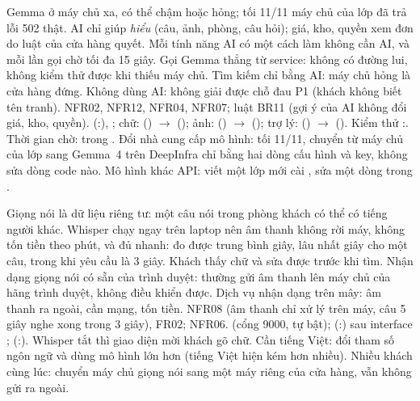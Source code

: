 {Gemma ở máy chủ xa, có thể chậm hoặc hỏng; tối 11/11 máy chủ của lớp đã trả lỗi 502 thật. AI chỉ giúp \emph{hiểu} (câu, ảnh, phòng, câu hỏi); giá, kho, quyền xem đơn do luật của cửa hàng quyết. Mỗi tính năng AI có một cách làm không cần AI, và mỗi lần gọi chờ tối đa 15 giây.}
{Gọi Gemma thẳng từ service: không có đường lui, không kiểm thử được khi thiếu máy chủ. Tìm kiếm chỉ bằng AI: máy chủ hỏng là cửa hàng đứng. Không dùng AI: không giải được chỗ đau P1 (khách không biết tên tranh).}
{NFR02, NFR12, NFR04, NFR07; luật BR11 (gợi ý của AI không đổi giá, kho, quyền).}
{ (:\dongLlmChat), ; chữ:  (\dongUnderstand) $\to$  (\dongParseRules); ảnh:  (\dongDescribe) $\to$  (\dongLocalColor); trợ lý:  (\dongAsk) $\to$  (\dongNoAi). Kiểm thử :\dongTestFallback. Thời gian chờ:  trong .}
{Đổi nhà cung cấp mô hình:  tối 11/11, chuyển từ máy chủ của lớp sang Gemma~4 trên DeepInfra chỉ bằng hai dòng cấu hình và key, không sửa dòng code nào. Mô hình khác API: viết một lớp mới cài , sửa một dòng trong .}

{Giọng nói là dữ liệu riêng tư: một câu nói trong phòng khách có thể có tiếng người khác. Whisper chạy ngay trên laptop nên âm thanh không rời máy, không tốn tiền theo phút, và đủ nhanh: đo được trung bình \evSttMean{} giây, lâu nhất \evSttMax{} giây cho một câu, trong khi yêu cầu là 3 giây. Khách thấy chữ và sửa được trước khi tìm.}
{Nhận dạng giọng nói có sẵn của trình duyệt: thường gửi âm thanh lên máy chủ của hãng trình duyệt, không điều khiển được. Dịch vụ nhận dạng trên mây: âm thanh ra ngoài, cần mạng, tốn tiền.}
{NFR08 (âm thanh chỉ xử lý trên máy, câu 5 giây nghe xong trong 3 giây), FR02; NFR06.}
{ (cổng 9000,  tự bật);  (:\dongWhisper) sau interface ;  (:\dongSpeech). Whisper tắt thì giao diện mời khách gõ chữ.}
{Cần tiếng Việt: đổi tham số ngôn ngữ và dùng mô hình lớn hơn (tiếng Việt hiện kém hơn nhiều). Nhiều khách cùng lúc: chuyển máy chủ giọng nói sang một máy riêng của cửa hàng, vẫn không gửi ra ngoài.}

